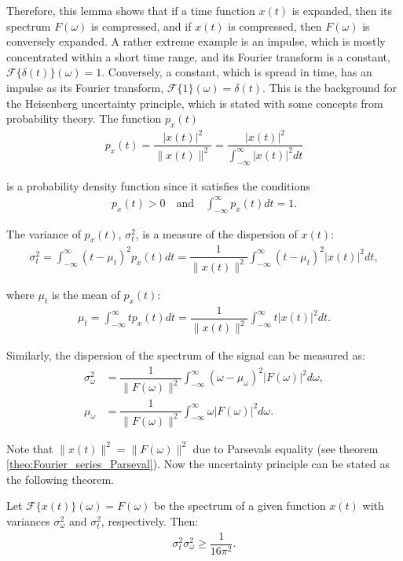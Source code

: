 Therefore, this lemma shows that if a time function $x(t)$ is expanded, then its spectrum $F(\omega)$ is compressed, and if $x(t)$ is compressed, then $F(\omega)$ is conversely expanded. A rather extreme example is an impulse, which is mostly concentrated within a short time range, and its Fourier transform is a constant, $\mathcal{F}\{\delta(t)\}(\omega) = 1$. Conversely, a constant, which is spread in time, has an impulse as its Fourier transform, $\mathcal{F}\{1\}(\omega) = \delta(t)$. This is the background for the Heisenberg uncertainty principle, which is stated with some concepts from probability theory. The function $p_x(t)$
\begin{align*}
p_x(t) = \dfrac{|x(t)|^2}{\|x(t)\|^2} = \dfrac{|x(t)|^2}{\int_{-\infty}^\infty |x(t)|^2 dt}
\end{align*}

is a probability density function since it satisfies the conditions
\begin{align*}
p_x(t) > 0 \quad \text{and} \quad \int_{-\infty}^\infty p_x(t) dt = 1.
\end{align*}

The variance of $p_x(t)$, $\sigma_t^2$, is a measure of the dispersion of $x(t)$:
\begin{align*}
\sigma_t^2 = \int_{-\infty}^\infty (t - \mu_t)^2 p_x(t) dt = \dfrac{1}{\|x(t)\|^2} \int_{-\infty}^\infty (t - \mu_t)^2 |x(t)|^2 dt,
\end{align*}

where $\mu_t$ is the mean of $p_x(t)$:
\begin{align*}
\mu_t = \int_{-\infty}^\infty t p_x(t) dt = \dfrac{1}{\|x(t)\|^2} \int_{-\infty}^\infty t |x(t)|^2 dt.
\end{align*}

Similarly, the dispersion of the spectrum of the signal can be measured as:
\begin{align*}
\sigma_\omega^2 &= \dfrac{1}{\|F(\omega)\|^2} \int_{-\infty}^\infty (\omega - \mu_\omega)^2 |F(\omega)|^2 d\omega, \\
\mu_\omega &= \dfrac{1}{\|F(\omega)\|^2} \int_{-\infty}^\infty \omega |F(\omega)|^2 d\omega.
\end{align*}

Note that $\|x(t)\|^2 = \|F(\omega)\|^2$ due to Parsevals equality (see theorem \ref{theo:Fourier_series_Parseval}). Now the uncertainty principle can be stated as the following theorem.

\begin{theorem}
Let $\mathcal{F}\{x(t)\}(\omega) = F(\omega)$ be the spectrum of a given function $x(t)$ with variances $\sigma_\omega^2$ and $\sigma_t^2$, respectively. Then:
\begin{align*}
\sigma_t^2 \sigma_\omega^2 \geq \dfrac{1}{16 \pi^2}.
\end{align*}
\end{theorem}

